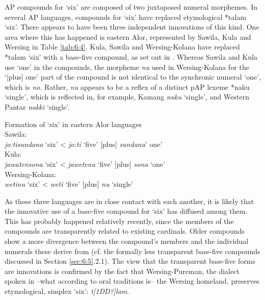\documentclass[output=paper]{LSP/langsci}
\begin{document}
AP compounds for `six' are composed of two juxtaposed numeral morphemes. In several AP languages, compounds for `six' have replaced etymological *talam `six'. There appears to have been three independent innovations of this kind. One area where this has happened is eastern Alor, represented by Sawila, Kula and Wersing in Table \ref{tab:6:4}. Kula, Sawila and Wersing-Kolana have replaced *talam `six' with a base-five compound, as set out in . Whereas Sawila and Kula use `one' in the compounds, the morpheme \textit{nu}\textit{{\ng}} used in Wersing-Kolana for the `[plus] one' part of the compound is not identical to the synchronic numeral `one', which is \textit{no}. Rather, \textit{nu}\textit{{\ng}} appears to be a reflex of a distinct pAP lexeme *naku{\ng} `single', which is reflected in, for example, Kamang \textit{nuku}\textit{{\ng}} `single', and Western Pantar \textit{nakki}\textit{{\ng}} `single'.



\ea%
\label{ex:6:4}
Formation of `six' in eastern Alor languages\\
 Sawila:\\
 \textit{jo:ti}\textit{{\ng}}\textit{sundana}\textbf{}   `six'   {\textless} \textit{jo:ti}\textit{{\ng}} `five'   [plus] \textit{sundana}' one'\\
   Kula:\\
   \textit{jawatensona}\textbf{}   `six'   {\textless} \textit{jawetena} `five' [plus] \textit{sona} `one'    \\
   Wersing-Kolana:\\   \textit{weti}\textit{{\ng}}\textit{nu}\textit{{\ng}}  `six'   {\textless} \textit{weti}\textit{{\ng}} `five'   [plus] \textit{nu}\textit{{\ng}} `single'    \\ 
\z

 

  

  

As these three languages are in close contact with each another, it is likely that the innovative use of a base-five compound for `six' has diffused among them. This has probably happened relatively recently, since the members of the compounds are transparently related to existing cardinals. Older compounds show a more divergence between the compound's members and the individual numerals these derive from (cf. the formally less transparent base-five compounds discussed in Section \ref{sec:6:5}.2.1). The view that the transparent base-five forms are innovations is confirmed by the fact that Wersing-Pureman, the dialect spoken in --what according to oral traditions is-- the Wersing homeland, preserves etymological, simplex `six': \textit{t}\textit{[1DD?]}\textit{lam}.
\end{document}
